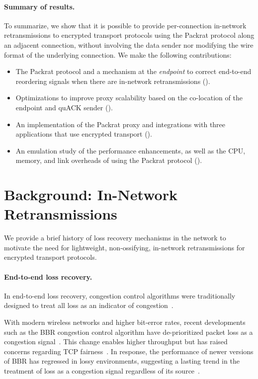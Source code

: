 \paragraph{Summary of results.}
To summarize, we show that it is possible to provide per-connection in-network
retransmissions to encrypted transport protocols using the Packrat protocol along
an adjacent connection, without involving the data sender nor modifying the
wire format of the underlying connection. We make the following contributions:

\begin{itemize}[noitemsep]
    \item The Packrat protocol and a mechanism at the \textit{endpoint} to correct
     end-to-end reordering signals when there are in-network retransmissions
     ().
    \item Optimizations to improve proxy
     scalability based on the co-location of the endpoint and quACK sender
     ().
    \item An implementation of the Packrat proxy and integrations with three
     applications that use encrypted transport ().
    \item An emulation study of the performance enhancements, as well as the CPU,
     memory, and link overheads of using the Packrat protocol ().
\end{itemize}

\section{Background: In-Network Retransmissions}
\label{sec:packrat:background}

We provide a brief history of loss recovery mechanisms in the network to
motivate the need for lightweight, non-ossifying, in-network retransmissions
for encrypted transport protocols.

\paragraph{End-to-end loss recovery.}

In end-to-end loss recovery,
congestion control algorithms were traditionally designed to treat all loss as an indicator of
congestion~\cite{rfc5681tcp,rfc2001tcp}.

With modern wireless networks and higher bit-error rates, recent developments
such as the BBR congestion control
algorithm have de-prioritized packet loss as a congestion
signal~\cite{cardwell2017bbr}. This change enables higher throughput but has
raised concerns regarding TCP fairness~\cite
{ware2019modeling,philip2024prudentia}. In response, the performance of newer
versions of BBR has regressed in lossy environments, suggesting a lasting trend
in the treatment of loss as a congestion signal regardless of its source~\cite
{yuan2025internet}.

